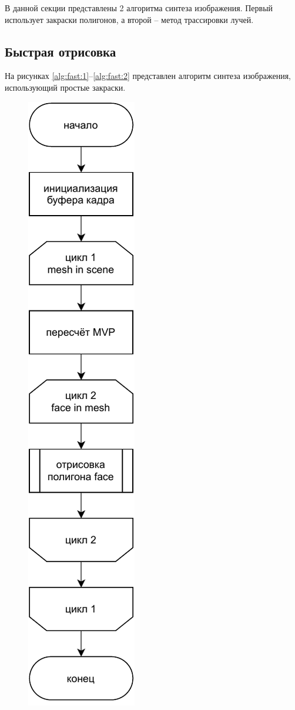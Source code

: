 В данной секции представлены 2 алгоритма синтеза изображения. Первый использует закраски полигонов, а второй -- метод трассировки лучей.

\subsection{Быстрая отрисовка}

На рисунках \ref{alg:fast:1}--\ref{alg:fast:2} представлен алгоритм синтеза изображения, использующий простые закраски.

\begin{figure}[h]
	\centering
	\includegraphics[width=\linewidth,height=0.65\textheight,keepaspectratio]{diagrams/fast.pdf}

\end{figure}
